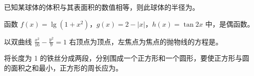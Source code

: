 \begin{question}
已知某球体的体积与其表面积的数值相等，则此球体的半径为\gkblank{}。

\end{question}
\begin{question}
函数 \(f(x)=\lg(1+x^2)\)，\(g(x)=2-|x|\)，\(h(x)=\tan 2x\) 中，\gkblank{}是偶函数。

\end{question}
\begin{question}
以双曲线 \(\frac{x^2}{16}-\frac{y^2}{9}=1\) 右顶点为顶点，左焦点为焦点的抛物线的方程是\gkblank{}。

\end{question}
\begin{question}
将长度为 1 的铁丝分成两段，分别围成一个正方形和一个圆形，要使正方形与圆的面积之和最小，正方形的周长应为\gkblank{}。

\end{question}

